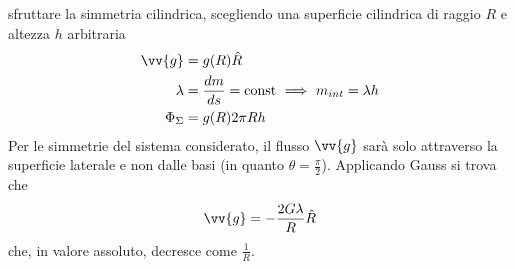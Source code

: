 \documentclass[a4paper, oneside]{book}
\begin{document}
sfruttare la simmetria cilindrica, scegliendo una superficie cilindrica di 
raggio $R$ e altezza $h$ arbitraria
\begin{align*}
    \vv{g} &= g(R)\hat{R} \\
    \lambda &= \frac{dm}{ds} = \text{const} \ \Longrightarrow \ m_{int} = \lambda h\\
    \Phi_\Sigma &= g(R) 2\pi R h
\end{align*}
Per le simmetrie del sistema considerato, il flusso $\vv{g}$ sarà solo attraverso 
la superficie laterale e non dalle basi (in quanto $\theta = \frac{\pi}{2}$). Applicando 
Gauss si trova che
\begin{gather*}
    \vv{g} = - \frac{2G\lambda}{R} \hat{R}  
\end{gather*} 
che, in valore assoluto,  decresce come $\frac{1}{R}$. 
\end{document}
